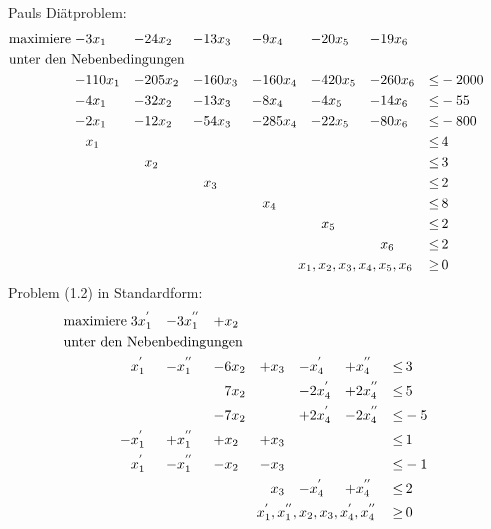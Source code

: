 \documentclass[10pt,a4paper,oneside,ngerman,numbers=noenddot]{scrartcl}
\begin{document}
	\subsection{} %
	Pauls Diätproblem:\\
	\begin{alignat*}{7}
		\text{maximiere}\; -& 3x_{1} &-& 24x_{2} &-& 13x_{3} &-& 9x_{4} &-& 20x_{5} &-& 19x_{6} && \\
		\multicolumn{14}{l}{\text{unter den Nebenbedingungen}} && \\
		- & 110x_{1} &-& 205x_{2} &-& 160x_{3} &-& 160x_{4} &-& 420x_{5} &-& 260x_{6} &\leq & -2000 \\
		-& 4x_{1} &-& 32x_{2} &-& 13x_{3} &-& 8x_{4} &-& 4x_{5} &-& 14x_{6} &\leq & -55 \\
		-& 2x_{1} &-& 12x_{2} &-& 54x_{3} &-& 285x_{4} &-& 22x_{5} &-& 80x_{6} &\leq & -800 \\
		& x_{1} && && && && && &\leq &\, 4 \\
		& && x_{2} && && && && &\leq &\, 3 \\
		& && && x_{3} && && && &\leq &\, 2 \\
		& && && && x_{4} && && &\leq &\, 8 \\
		& && && && && x_{5} && &\leq &\, 2 \\
		& && && && && && x_{6} &\leq &\, 2 \\
		\multicolumn{12}{r}{$x_{1}, x_{2}, x_{3}, x_{4}, x_{5}, x_{6}$} \,&\geq &\, 0
		\end{alignat*}
		Problem (1.2) in Standardform:\\
		\begin{alignat*}{7}
		\text{maximiere}\; & 3x_{1}^{'} &-& 3x_{1}^{''} &+& x_{2} && && && \\
		\multicolumn{14}{l}{\text{unter den Nebenbedingungen}} && \\
		& x_{1}^{'} &-& x_{1}^{''} &-& 6x_{2} &+& x_{3} &-& x_{4}^{'} &+& x_{4}^{''} &\leq &\, 3 \\
		& && && 7x_{2} && &-& 2x_{4}^{'} &+& 2x_{4}^{''} &\leq &\, 5 \\
		& && &-& 7x_{2} && &+& 2x_{4}^{'} &-& 2x_{4}^{''} &\leq & -5 \\
		-& x_{1}^{'} &+& x_{1}^{''} &+& x_{2} &+& x_{3} && && &\leq &\, 1 \\
		& x_{1}^{'} &-& x_{1}^{''} &-& x_{2} &-& x_{3} && && &\leq & -1 \\
		& && && && x_{3} &-& x_{4}^{'} &+& x_{4}^{''} &\leq &\, 2 \\
		\multicolumn{12}{r}{$x_{1}^{'}, x_{1}^{''}, x_{2}, x_{3}, x_{4}^{'}, x_{4}^{''}$} \,&\geq &\, 0
		\end{alignat*}
\end{document}
